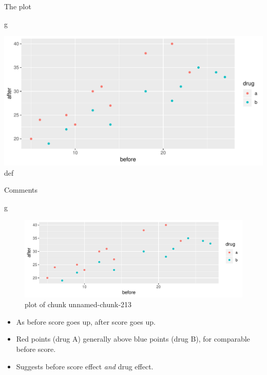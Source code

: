 \documentclass[ignorenonframetext,]{beamer}
\newenvironment{Shaded}{\begin{snugshade}}{\end{snugshade}}
\newcommand{\NormalTok}[1]{#1}
\begin{document}
\begin{frame}[fragile]{The plot}
\protect\hypertarget{the-plot-5}{}

\begin{Shaded}
\begin{Highlighting}[]
\NormalTok{g}
\end{Highlighting}
\end{Shaded}

\includegraphics{figure/spizzo-1.pdf} def

\end{frame}

\begin{frame}[fragile]{Comments}
\protect\hypertarget{comments-14}{}

\begin{Shaded}
\begin{Highlighting}[]
\NormalTok{g}
\end{Highlighting}
\end{Shaded}

\begin{figure}
\centering
\includegraphics{figure/unnamed-chunk-213-1.pdf}
\caption{plot of chunk unnamed-chunk-213}
\end{figure}

\begin{itemize}
\item
  As before score goes up, after score goes up.
\item
  Red points (drug A) generally above blue points (drug B), for
  comparable before score.
\item
  Suggests before score effect \emph{and} drug effect.
\end{itemize}

\end{frame}
\end{document}
